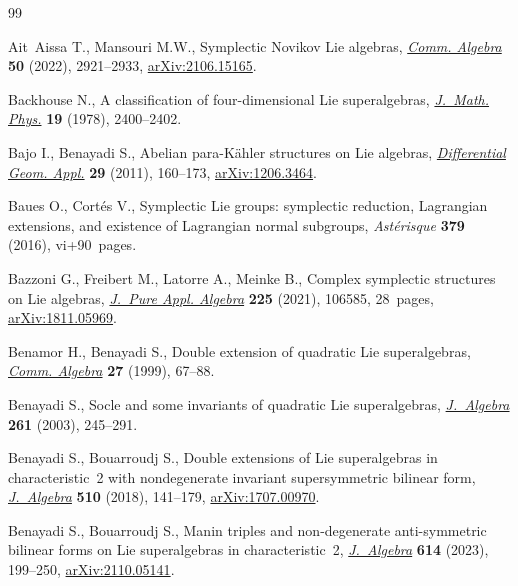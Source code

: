 \documentclass[10pt,a4paper]{amsart}
\numberwithin{equation}{section}
\begin{document}
\begin{thebibliography}{99}
\footnotesize\itemsep=0pt

Ait~Aissa T., Mansouri M.W., Symplectic {N}ovikov {L}ie algebras, \href{https://doi.org/10.1080/00927872.2021.2022157}{\textit{Comm.
 Algebra}} \textbf{50} (2022), 2921--2933, \href{https://arxiv.org/abs/2106.15165}{arXiv:2106.15165}.

Backhouse N., A classification of four-dimensional {L}ie superalgebras,
 \href{https://doi.org/10.1063/1.523598}{\textit{J.~Math. Phys.}} \textbf{19} (1978), 2400--2402.

Bajo I., Benayadi S., Abelian para-{K}\"ahler structures on {L}ie algebras,
 \href{https://doi.org/10.1016/j.difgeo.2011.02.003}{\textit{Differential Geom. Appl.}} \textbf{29} (2011), 160--173,
 \href{https://arxiv.org/abs/1206.3464}{arXiv:1206.3464}.

Baues O., Cort\'es V., Symplectic {L}ie groups: symplectic reduction,
 {L}agrangian extensions, and existence of {L}agrangian normal subgroups,
 \textit{Ast\'erisque} \textbf{379} (2016), vi+90~pages.

Bazzoni G., Freibert M., Latorre A., Meinke B., Complex symplectic structures
 on {L}ie algebras, \href{https://doi.org/10.1016/j.jpaa.2020.106585}{\textit{J.~Pure Appl. Algebra}} \textbf{225} (2021),
 106585, 28~pages, \href{https://arxiv.org/abs/1811.05969}{arXiv:1811.05969}.

Benamor H., Benayadi S., Double extension of quadratic {L}ie superalgebras,
 \href{https://doi.org/10.1080/00927879908826421}{\textit{Comm. Algebra}} \textbf{27} (1999), 67--88.

Benayadi S., Socle and some invariants of quadratic {L}ie superalgebras,
 \href{https://doi.org/10.1016/S0021-8693(02)00682-8}{\textit{J.~Algebra}} \textbf{261} (2003), 245--291.

Benayadi S., Bouarroudj S., Double extensions of {L}ie superalgebras in
 characteristic~2 with nondegenerate invariant supersymmetric bilinear form,
 \href{https://doi.org/10.1016/j.jalgebra.2018.06.005}{\textit{J.~Algebra}} \textbf{510} (2018), 141--179, \href{https://arxiv.org/abs/1707.00970}{arXiv:1707.00970}.

Benayadi S., Bouarroudj S., Manin triples and non-degenerate anti-symmetric
 bilinear forms on {L}ie superalgebras in characteristic~2,
 \href{https://doi.org/10.1016/j.jalgebra.2022.09.019}{\textit{J.~Algebra}} \textbf{614} (2023), 199--250, \href{https://arxiv.org/abs/2110.05141}{arXiv:2110.05141}.


\end{thebibliography}
\end{document}
